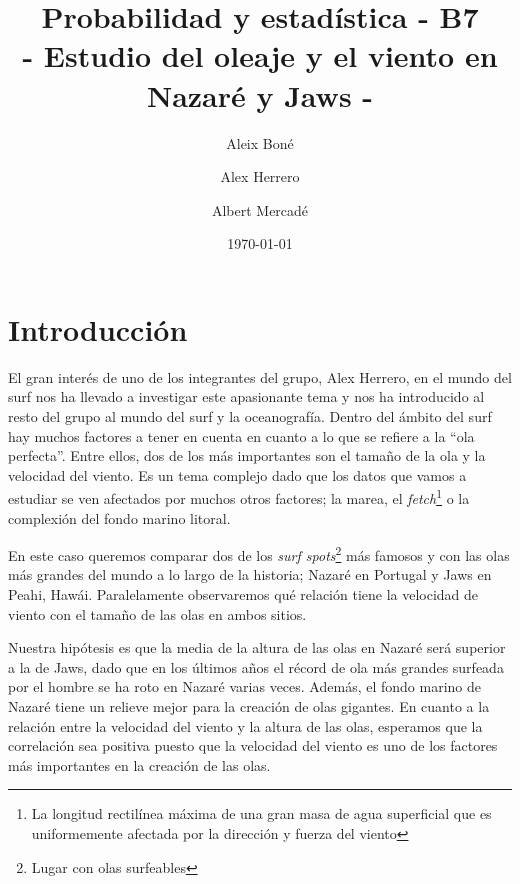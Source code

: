 


\title{
   Probabilidad y estadística - B7 \\
   \large 
   - Estudio del oleaje y el viento en Nazaré y Jaws -
}
\author{
  Aleix Boné \and
  Alex Herrero \and
  Albert Mercadé
}
\date{
  \today
}


\maketitle

\begin{abstract}
\end{abstract}

\section{Introducción}%
\label{sec:introduccion}
El gran interés de uno de los integrantes del grupo, Alex Herrero, en el mundo del surf nos ha llevado a investigar este apasionante tema y nos ha introducido al resto del grupo al mundo del surf y la oceanografía. Dentro del ámbito del surf hay muchos factores a tener en cuenta en cuanto a lo que se refiere a la ``ola perfecta''. Entre ellos, dos de los más importantes son el tamaño de la ola y la velocidad del viento. Es un tema complejo dado que los datos que vamos a estudiar se ven afectados por muchos otros factores; la marea, el \textit{fetch}\footnote{La longitud rectilínea máxima de una gran masa de agua superficial que es uniformemente afectada por la dirección y fuerza del viento} o la complexión del fondo marino litoral.

En este caso queremos comparar dos de los \textit{surf spots}\footnote{Lugar con olas surfeables} más famosos y con las olas más grandes del mundo a lo largo de la historia; Nazaré en Portugal y Jaws en Peahi, Hawái. Paralelamente observaremos qué relación tiene la velocidad de viento con el tamaño de las olas en ambos sitios.

Nuestra hipótesis es que la media de la altura de las olas en Nazaré será superior a la de Jaws, dado que en los últimos años el récord de ola más grandes surfeada por el hombre se ha roto en Nazaré varias veces. Además, el fondo marino de Nazaré tiene un relieve mejor para la creación de olas gigantes. En cuanto a la relación entre la velocidad del viento y la altura de las olas, esperamos que la correlación sea positiva
puesto que la velocidad del viento es uno de los factores más importantes en la creación de las olas.

